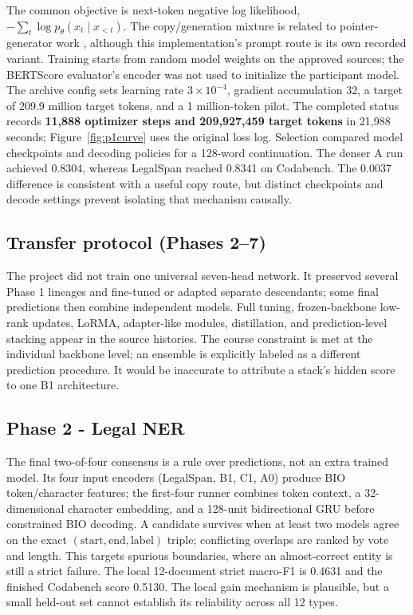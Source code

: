 \documentclass[11pt,oneside]{article}
\begin{document}
The common objective is next-token negative log likelihood, $-\sum_t\log p_\theta(x_t\mid x_{<t})$. The copy/generation mixture is related to pointer-generator work \cite{see2017pointer}, although this implementation's prompt route is its own recorded variant. Training starts from random model weights on the approved sources; the BERTScore evaluator's encoder was not used to initialize the participant model. The archive config sets learning rate $3\times10^{-4}$, gradient accumulation 32, a target of 209.9 million target tokens, and a 1 million-token pilot. The completed status records \textbf{11,888 optimizer steps and 209,927,459 target tokens} in 21,988 seconds; Figure~\ref{fig:p1curve} uses the original loss log. Selection compared model checkpoints and decoding policies for a 128-word continuation. The denser A run achieved 0.8304, whereas LegalSpan reached 0.8341 on Codabench. The 0.0037 difference is consistent with a useful copy route, but distinct checkpoints and decode settings prevent isolating that mechanism causally.

\subsection{Transfer protocol (Phases 2--7)}
The project did not train one universal seven-head network. It preserved several Phase 1 lineages and fine-tuned or adapted separate descendants; some final predictions then combine independent models. Full tuning, frozen-backbone low-rank updates, LoRMA, adapter-like modules, distillation, and prediction-level stacking appear in the source histories. The course constraint is met at the individual backbone level; an ensemble is explicitly labeled as a different prediction procedure. It would be inaccurate to attribute a stack's hidden score to one B1 architecture.

\subsection{Phase 2 - Legal NER}
The final two-of-four consensus is a rule over predictions, not an extra trained model. Its four input encoders (LegalSpan, B1, C1, A0) produce BIO token/character features; the first-four runner combines token context, a 32-dimensional character embedding, and a 128-unit bidirectional GRU before constrained BIO decoding. A candidate survives when at least two models agree on the exact $(\mathrm{start},\mathrm{end},\mathrm{label})$ triple; conflicting overlaps are ranked by vote and length. This targets spurious boundaries, where an almost-correct entity is still a strict failure. The local 12-document strict macro-F1 is 0.4631 and the finished Codabench score 0.5130. The local gain mechanism is plausible, but a small held-out set cannot establish its reliability across all 12 types.
\end{document}
